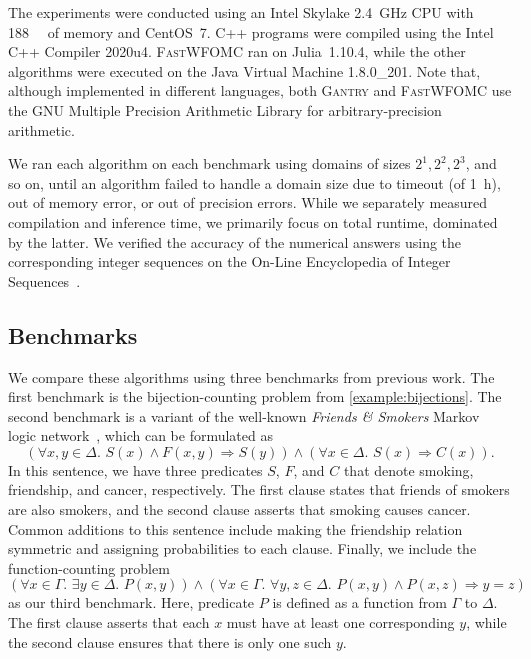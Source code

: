 \documentclass[a4paper,UKenglish,cleveref, autoref, thm-restate]{lipics-v2021}
\newcommand{\Cranetwo}{\textsc{Gantry}}
\newcommand{\friends}{\emph{Friends \& Smokers}}
\begin{document}
The experiments were conducted using an Intel Skylake \SI{2.4}{\giga\hertz} CPU
with \SI{188}{\gibi\byte} of memory and CentOS~7. C++ programs were compiled
using the Intel C++ Compiler 2020u4. \textsc{FastWFOMC} ran on Julia~1.10.4,
while the other algorithms were executed on the Java Virtual Machine 1.8.0\_201.
Note that, although implemented in different languages, both \Cranetwo{} and
\textsc{FastWFOMC} use the GNU Multiple Precision Arithmetic Library for
arbitrary-precision arithmetic.

We ran each algorithm on each benchmark using domains of sizes
$2^{1}, 2^{2}, 2^{3}$, and so on, until an algorithm failed to handle a domain
size due to timeout (of \SI{1}{\hour}), out of memory error, or out of precision
errors. While we separately measured compilation and inference time, we
primarily focus on total runtime, dominated by the latter. We verified the
accuracy of the numerical answers using the corresponding integer sequences on
the On-Line Encyclopedia of Integer Sequences~\cite{oeis}.

\subsection{Benchmarks}

We compare these algorithms using three benchmarks from previous work. The first
benchmark is the bijection-counting problem from \cref{example:bijections}. The
second benchmark is a variant of the well-known \friends{} Markov logic
network~\cite{DBLP:conf/aaai/SinglaD08,DBLP:conf/uai/BroeckCD12}, which can be
formulated as
\[
  (\forall x,y \in \Delta\text{.
  } S(x) \land F(x, y) \Rightarrow S(y)) \land (\forall x \in \Delta\text{.
  }S(x) \Rightarrow C(x)).
\]
In this sentence, we have three predicates $S$, $F$, and $C$ that denote
smoking, friendship, and cancer, respectively. The first clause states that
friends of smokers are also smokers, and the second clause asserts that smoking
causes cancer. Common additions to this sentence include making the friendship
relation symmetric and assigning probabilities to each clause. Finally, we
include the function-counting problem~\cite{DBLP:conf/kr/DilkasB23}
\[
  (\forall x \in \Gamma\text{. }\exists y \in \Delta\text{.
  }P(x, y)) \land (\forall x \in \Gamma\text{. }\forall y, z \in \Delta\text{.
  }P(x, y) \land P(x, z) \Rightarrow y = z)
\]
as our third benchmark. Here, predicate $P$ is defined as a function from
$\Gamma$ to $\Delta$. The first clause asserts that each $x$ must have at least
one corresponding $y$, while the second clause ensures that there is only one
such $y$.
\end{document}

